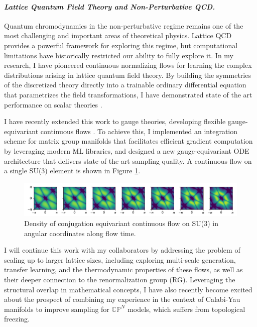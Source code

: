 \documentclass[11pt]{article}
\begin{document}
\paragraph{\textit{{Lattice Quantum Field Theory and Non-Perturbative QCD.}}}
Quantum chromodynamics in the non-perturbative regime remains one of the most challenging and important areas of theoretical physics.
Lattice QCD provides a powerful framework for exploring this regime, but computational limitations have historically restricted our ability to fully explore it.
In my research, I have pioneered continuous normalizing flows for learning the complex distributions arising in lattice quantum field theory. By building the symmetries of the discretized theory directly into a trainable ordinary differential equation that parametrizes the field transformations, I have demonstrated state of the art performance on scalar theories \cite{gerdes2023LearningLattice}.

I have recently extended this work to gauge theories, developing flexible gauge-equivariant continuous flows \cite{gerdes2024continuousGauge}.
To achieve this, I implemented an integration scheme for matrix group manifolds that facilitates efficient gradient computation by leveraging modern ML libraries, and designed a new gauge-equivariant ODE architecture that delivers state-of-the-art sampling quality.
A continuous flow on a single SU(3) element is shown in Figure \ref{fig:su3}.

\begin{figure}
    \centering
    \includegraphics[width=\linewidth]{su3.pdf}
    \vspace{-25pt}
    \caption{\footnotesize Density of conjugation equivariant continuous flow on SU(3) in angular coordinates along flow time.}
    \label{fig:su3}
    \vspace{-10pt}
\end{figure}

\textbf{\color{royalblue}{Future Directions.}}
I will continue this work with my collaborators by addressing the problem of scaling up to larger lattice sizes, including exploring multi-scale generation, transfer learning, and the thermodynamic properties of these flows, as well as their deeper connection to the renormalization group (RG). Leveraging the structural overlap in mathematical concepts, I have also recently become excited about the prospect of combining my experience in the context of Calabi-Yau manifolds to improve sampling for $\mathbb{CP}^N$ models, which suffers from topological freezing.
\end{document}
